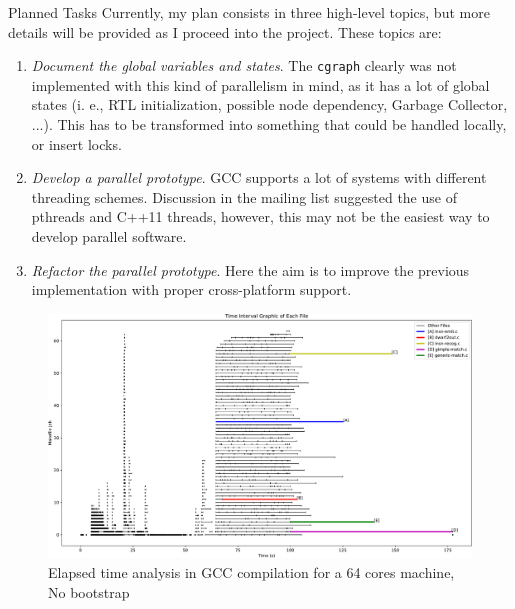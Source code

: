 \documentclass[12pt]{article}
\begin{document}
\begin{subsection}{Planned Tasks}
    Currently, my plan consists in three high-level topics, but more details
will be provided as I proceed into the project. These topics are:

\begin{enumerate}
    \item \textit{Document the global variables and states}. The \texttt{cgraph}
clearly was not implemented with this kind of parallelism in mind, as it has a lot
of global states (i. e., RTL initialization, possible node dependency,
Garbage Collector, ...). This has to be transformed into something that could
be handled locally, or insert locks.
	\item \textit{Develop a parallel prototype}. GCC supports a lot of systems
with different threading schemes. Discussion in the mailing list suggested the
use of pthreads and C++11 threads, however, this may not be the easiest way to
develop parallel software.
	\item \textit{Refactor the parallel prototype}. Here the aim is to improve
the previous implementation with proper cross-platform support.
\end{enumerate}


\begin{figure}[ht]
 \centering
 \includegraphics[scale=0.6, angle=-90]{out-crop.pdf}
 \caption{Elapsed time analysis in GCC compilation for a 64 cores machine, No bootstrap}
 \label{fig:analysis}
\end{figure}

\end{subsection}
\end{document}
